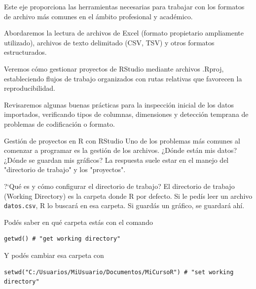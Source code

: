 \documentclass[8pt]{beamer}
\begin{document}
	\subtitle{3er encuentro: Carga de datos y gráficos sencillos}

	\begin{frame}[plain]
		\maketitle
	\end{frame}


	\begin{frame}
		Este eje proporciona las herramientas necesarias para trabajar con los formatos de archivo más comunes en el ámbito profesional y académico. 
		
		Abordaremos la lectura de archivos de Excel (formato propietario ampliamente utilizado), archivos de texto delimitado (CSV, TSV) y otros formatos estructurados. 
		
		Veremos c\'omo gestionar proyectos de RStudio mediante archivos .Rproj, estableciendo flujos de trabajo organizados con rutas relativas que favorecen la reproducibilidad. 
		
		Revisaremos algunas buenas prácticas para la inspección inicial de los datos importados, verificando tipos de columnas, dimensiones y detección temprana de problemas de codificación o formato.
	\end{frame}
	
	
	
	
	
	\begin{frame}{Gesti\'on de proyectos en R con RStudio}
		Uno de los problemas más comunes al comenzar a programar es la gestión de los archivos. ¿Dónde están mis datos? ¿Dónde se guardan mis gráficos?  La respuesta suele estar en el manejo del "directorio de trabajo" y los "proyectos".
	\end{frame}



	\begin{frame}[fragile]{?`Qué es y cómo configurar el directorio de trabajo?}
		El directorio de trabajo (Working Directory) es la carpeta donde R  por defecto. Si le ped\'is leer un archivo \texttt{datos.csv}, R lo buscará en esa carpeta. Si guard\'as un gráfico, se guardará ahí.
		
		Pod\'es saber en qué carpeta estás  con el comando
\begin{lstlisting}[style=RScript]
getwd() # "get working directory"
\end{lstlisting}		
		Y pod\'es cambiar esa carpeta con
\begin{lstlisting}[style=RScript]
setwd("C:/Usuarios/MiUsuario/Documentos/MiCursoR") # "set working directory"	
\end{lstlisting}
	\end{frame}
	
\end{document}
